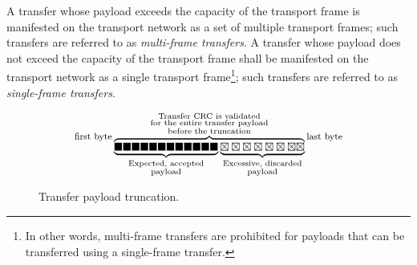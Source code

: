A transfer whose payload exceeds the capacity of the transport frame is manifested on the transport network
as a set of multiple transport frames; such transfers are referred to as \emph{multi-frame transfers}.
A transfer whose payload does not exceed the capacity of the transport frame shall be manifested on the transport
network as a single transport frame\footnote{%
    In other words, multi-frame transfers are prohibited for payloads that can be transferred
    using a single-frame transfer.
}; such transfers are referred to as \emph{single-frame transfers}.

\begin{figure}[H]
    $$
    \raisebox{1em}{\footnotesize{\text{first byte}}}
    \overbrace{%
        \underbrace{%
            \blacksquare\blacksquare\blacksquare\blacksquare\blacksquare\blacksquare%
            \blacksquare\blacksquare\blacksquare\blacksquare\blacksquare\blacksquare%
        }_{\substack{\text{Expected, accepted} \\ \text{payload}}}%
        \underbrace{%
            \boxtimes\boxtimes\boxtimes\boxtimes\boxtimes\boxtimes\boxtimes\boxtimes%
        }_{\substack{\text{Excessive, discarded} \\ \text{payload}}}%
    }^{\substack{%
        \text{Transfer CRC is validated} \\
        \text{for the entire transfer payload} \\
        \text{before the truncation}}
    }
    \raisebox{1em}{\footnotesize{\text{last byte}}}
    $$
    \caption{Transfer payload truncation.\label{fig:transport_payload_truncation}}
\end{figure}

